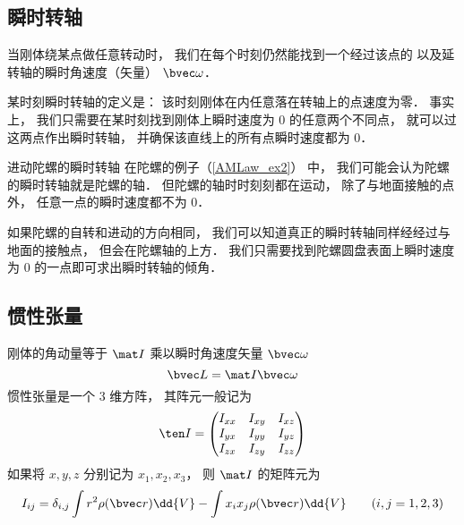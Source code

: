 

\subsection{瞬时转轴}
当刚体绕某点做任意转动时， 我们在每个时刻仍然能找到一个经过该点的 以及延转轴的瞬时角速度（矢量） $\bvec \omega$．

某时刻瞬时转轴的定义是： 该时刻刚体在内任意落在转轴上的点速度为零． 事实上， 我们只需要在某时刻找到刚体上瞬时速度为 0 的任意两个不同点， 就可以过这两点作出瞬时转轴， 并确保该直线上的所有点瞬时速度都为 0．

\begin{exam}{进动陀螺的瞬时转轴}
在陀螺的例子（\autoref{AMLaw_ex2}） 中， 我们可能会认为陀螺的瞬时转轴就是陀螺的轴． 但陀螺的轴时时刻刻都在运动， 除了与地面接触的点外， 任意一点的瞬时速度都不为 0．

如果陀螺的自转和进动的方向相同， 我们可以知道真正的瞬时转轴同样经经过与地面的接触点， 但会在陀螺轴的上方． 我们只需要找到陀螺圆盘表面上瞬时速度为 0 的一点即可求出瞬时转轴的倾角．
\end{exam}

\subsection{惯性张量}
刚体的角动量等于 $\mat I$ 乘以瞬时角速度矢量 $\bvec \omega$
\begin{equation}
\bvec L = \mat I \bvec \omega
\end{equation}
惯性张量是一个 3 维方阵， 其阵元一般记为
\begin{equation}
\ten I = \begin{pmatrix}
I_{xx}& I_{xy}& I_{xz} \\
I_{yx}& I_{yy}& I_{yz} \\
I_{zx}& I_{zy}& I_{zz}
\end{pmatrix}
\end{equation}
如果将 $x, y, z$ 分别记为 $x_1, x_2, x_3$， 则 $\mat I$ 的矩阵元为
\begin{equation}
I_{ij} = \delta_{i, j} \int r^2 \rho(\bvec r)\dd{V} - \int x_i x_j \rho(\bvec r)\dd{V} \qquad (i, j = 1, 2, 3)
\end{equation}

